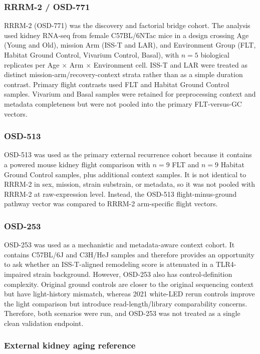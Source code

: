 \documentclass[11pt]{article}
\begin{document}
\subsubsection{RRRM-2 / OSD-771}

RRRM-2 (OSD-771) was the discovery and factorial bridge cohort. The analysis used kidney RNA-seq from female C57BL/6NTac mice in a design crossing Age (Young and Old), mission Arm (ISS-T and LAR), and Environment Group (FLT, Habitat Ground Control, Vivarium Control, Basal), with $n=5$ biological replicates per Age $\times$ Arm $\times$ Environment cell. ISS-T and LAR were treated as distinct mission-arm/recovery-context strata rather than as a simple duration contrast. Primary flight contrasts used FLT and Habitat Ground Control samples. Vivarium and Basal samples were retained for preprocessing context and metadata completeness but were not pooled into the primary FLT-versus-GC vectors.

\subsubsection{OSD-513}

OSD-513 was used as the primary external recurrence cohort because it contains a powered mouse kidney flight comparison with $n=9$ FLT and $n=9$ Habitat Ground Control samples, plus additional context samples. It is not identical to RRRM-2 in sex, mission, strain substrain, or metadata, so it was not pooled with RRRM-2 at raw-expression level. Instead, the OSD-513 flight-minus-ground pathway vector was compared to RRRM-2 arm-specific flight vectors.

\subsubsection{OSD-253}

OSD-253 was used as a mechanistic and metadata-aware context cohort. It contains C57BL/6J and C3H/HeJ samples and therefore provides an opportunity to ask whether an ISS-T-aligned remodeling score is attenuated in a TLR4-impaired strain background. However, OSD-253 also has control-definition complexity. Original ground controls are closer to the original sequencing context but have light-history mismatch, whereas 2021 white-LED rerun controls improve the light comparison but introduce read-length/library comparability concerns. Therefore, both scenarios were run, and OSD-253 was not treated as a single clean validation endpoint.

\subsubsection{External kidney aging reference}
\end{document}
